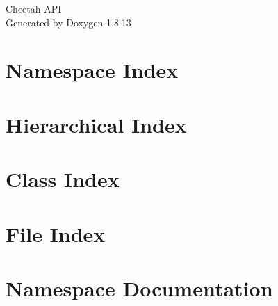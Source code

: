 \documentclass[twoside]{book}
\newcommand{\+}{\discretionary{\mbox{\scriptsize$\hookleftarrow$}}{}{}}
\newcommand{\clearemptydoublepage}{%
  \newpage{\pagestyle{empty}\cleardoublepage}%
}
\begin{document}
\hypersetup{pageanchor=false,
             bookmarksnumbered=true,
             pdfencoding=unicode
            }
\begin{titlepage}
\vspace*{7cm}
\begin{center}%
{\Large Cheetah A\+PI }\\
\vspace*{1cm}
{\large Generated by Doxygen 1.8.13}\\
\end{center}
\end{titlepage}
\clearemptydoublepage
{}
\tableofcontents
\clearemptydoublepage
{}
\hypersetup{pageanchor=true}

\chapter{Namespace Index}

\chapter{Hierarchical Index}

\chapter{Class Index}

\chapter{File Index}

\chapter{Namespace Documentation}

















\end{document}
